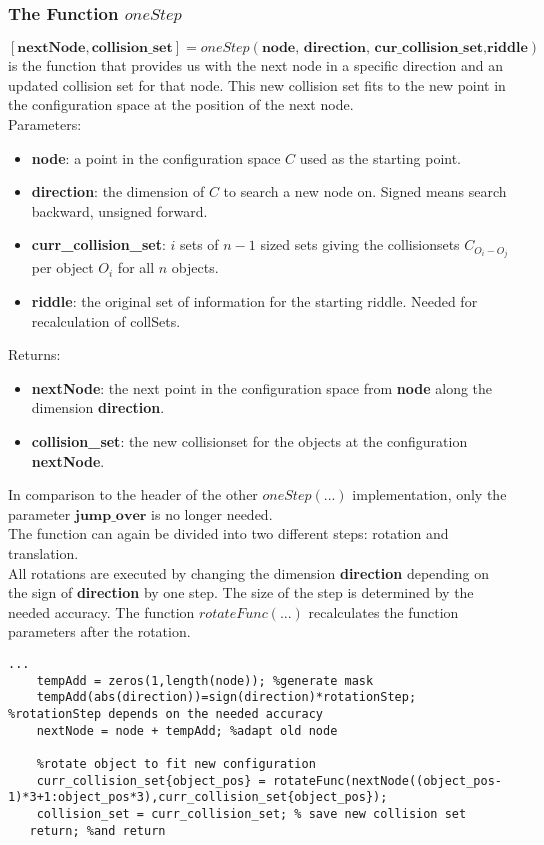 \subsubsection{The Function $oneStep$}
$[\textbf{nextNode}, \textbf{collision\_set} ]=oneStep(\textbf{node, direction, cur\_collision\_set,riddle})$ is the function that provides us with the next node in a specific direction and an updated collision set for that node. This new collision set fits to the new point in the configuration space at the position of the next node.\\
Parameters:
\begin{itemize}
\item \textbf{node}: a point in the configuration space $C$ used as the starting point.
\item \textbf{direction}: the dimension of $C$ to search a new node on. Signed means search backward, unsigned forward. 
\item \textbf{curr\_collision\_set}: $i$ sets of $n-1$ sized sets giving the collisionsets $C_{O_i-O_j}$ per object $O_i$ for all $n$ objects.
\item \textbf{riddle}: the original set of information for the starting riddle. Needed for recalculation of collSets.
\end{itemize}
Returns:
\begin{itemize}
\item \textbf{nextNode}: the next point in the configuration space from \textbf{node} along the dimension \textbf{direction}.
\item \textbf{collision\_set}: the new collisionset for the objects at the configuration \textbf{nextNode}.
\end{itemize}
In comparison to the header of the other $oneStep(...)$ implementation, only the parameter $\textbf{jump\_over}$ is no longer needed.\\
The function can again be divided into two different steps: rotation and translation.\\
All rotations are executed by changing the dimension \textbf{direction}  depending on the sign of \textbf{direction} by one step. The size of the step is determined 
by the needed accuracy. The function $rotateFunc(...)$ recalculates the function parameters after the rotation. \\
\begin{lstlisting}
...
    tempAdd = zeros(1,length(node)); %generate mask
    tempAdd(abs(direction))=sign(direction)*rotationStep; %rotationStep depends on the needed accuracy
    nextNode = node + tempAdd; %adapt old node
    
    %rotate object to fit new configuration
    curr_collision_set{object_pos} = rotateFunc(nextNode((object_pos-1)*3+1:object_pos*3),curr_collision_set{object_pos}); 
    collision_set = curr_collision_set; % save new collision set
   return; %and return
\end{lstlisting}
